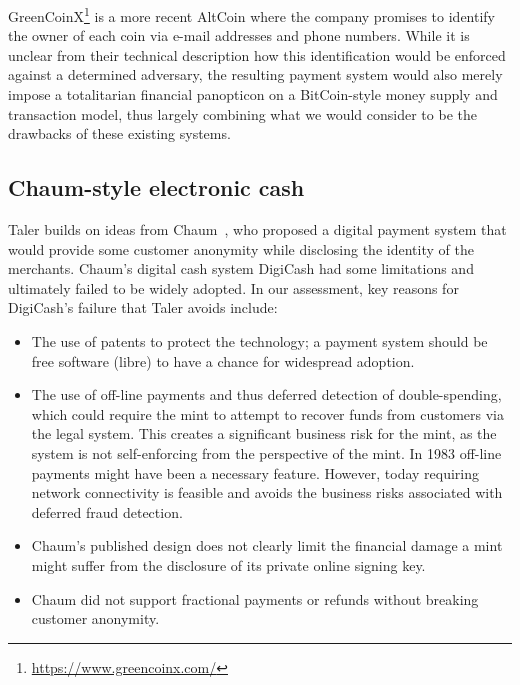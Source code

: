\documentclass{llncs}
\begin{document}
GreenCoinX\footnote{\url{https://www.greencoinx.com/}} is a more
recent AltCoin where the company promises to identify the owner of
each coin via e-mail addresses and phone numbers.  While it is unclear
from their technical description how this identification would be
enforced against a determined adversary, the resulting payment system
would also merely impose a totalitarian financial panopticon on a
BitCoin-style money supply and transaction model, thus largely
combining what we would consider to be the drawbacks of these existing
systems.

\subsection{Chaum-style electronic cash}

Taler builds on ideas from Chaum~\cite{chaum1983blind}, who proposed a
digital payment system that would provide some customer anonymity
while disclosing the identity of the merchants.  Chaum's digital cash
system DigiCash had some limitations and ultimately failed to be widely
adopted.  In our assessment, key reasons for DigiCash's failure that
Taler avoids include:

\begin{itemize}
 \item The use of patents to protect the technology; a payment system
   should be free software (libre) to have a chance for widespread adoption.
 \item The use of off-line payments and thus deferred detection of
   double-spending, which could require the mint to attempt to recover
   funds from customers via the legal system.  This creates a
   significant business risk for the mint, as the system is not
   self-enforcing from the perspective of the mint.  In 1983 off-line
   payments might have been a necessary feature.  However, today
   requiring network connectivity is feasible and avoids the business
   risks associated with deferred fraud detection.
 \item %
   Chaum's published design does not clearly
   limit the financial damage a mint might suffer from the
   disclosure of its private online signing key.
 \item Chaum did not support fractional payments or refunds without
   breaking customer anonymity.
\end{itemize}
\end{document}
